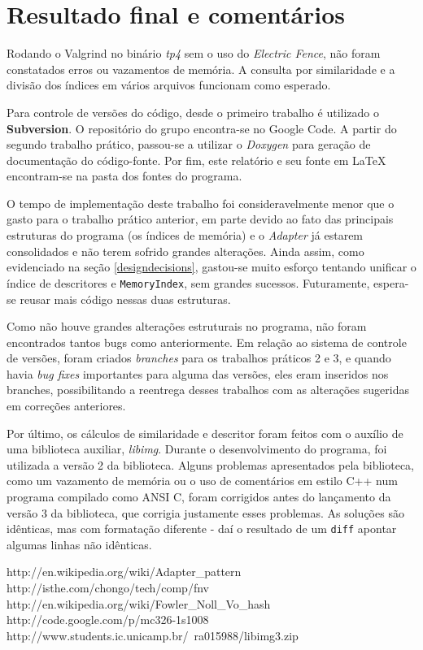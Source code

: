 \documentclass[a4paper,10pt]{article}
\begin{document}
\section{Resultado final e comentários}
Rodando o Valgrind no binário \textit{tp4} sem o uso do \textit{Electric Fence}, não foram constatados erros ou vazamentos de memória. A consulta por similaridade e a divisão dos índices em vários arquivos funcionam como esperado.

Para controle de versões do código, desde o primeiro trabalho é utilizado o \textbf{Subversion}. O repositório do grupo encontra-se no Google Code\cite{googlecode}. A partir do segundo trabalho prático, passou-se a utilizar o \textit{Doxygen} para geração de documentação do código-fonte. Por fim, este relatório e seu fonte em LaTeX encontram-se na pasta dos fontes do programa.

O tempo de implementação deste trabalho foi consideravelmente menor que o gasto para o trabalho prático anterior, em parte devido ao fato das principais estruturas do programa (os índices de memória) e o \textit{Adapter} já estarem consolidados e não terem sofrido grandes alterações. Ainda assim, como evidenciado na seção \ref{designdecisions}, gastou-se muito esforço tentando unificar o índice de descritores e \texttt{MemoryIndex}, sem grandes sucessos. Futuramente, espera-se reusar mais código nessas duas estruturas.

Como não houve grandes alterações estruturais no programa, não foram encontrados tantos bugs como anteriormente. Em relação ao sistema de controle de versões, foram criados \textit{branches} para os trabalhos práticos 2 e 3, e quando havia \textit{bug fixes} importantes para alguma das versões, eles eram inseridos nos branches, possibilitando a reentrega desses trabalhos com as alterações sugeridas em correções anteriores.

Por último, os cálculos de similaridade e descritor foram feitos com o auxílio de uma biblioteca auxiliar, \textit{libimg}\cite{libimg}. Durante o desenvolvimento do programa, foi utilizada a versão 2 da biblioteca. Alguns problemas apresentados pela biblioteca, como um vazamento de memória ou o uso de comentários em estilo C++ num programa compilado como ANSI C, foram corrigidos antes do lançamento da versão 3 da biblioteca, que corrigia justamente esses problemas. As soluções são idênticas, mas com formatação diferente - daí o resultado de um \texttt{diff} apontar algumas linhas não idênticas.

\begin{thebibliography}{99}
 http://en.wikipedia.org/wiki/Adapter\_pattern
 http://isthe.com/chongo/tech/comp/fnv
 http://en.wikipedia.org/wiki/Fowler\_Noll\_Vo\_hash
 http://code.google.com/p/mc326-1s1008
 http://www.students.ic.unicamp.br/~ra015988/libimg3.zip
\end{thebibliography}
\end{document}
